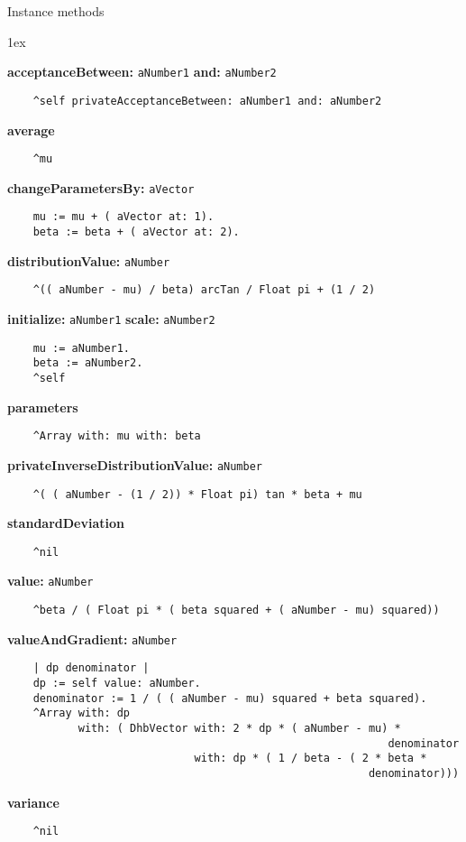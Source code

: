 Instance methods
{\parskip 1ex\par\noindent}
{\bf acceptanceBetween:} {\tt aNumber1} {\bf and:} {\tt aNumber2}
\begin{verbatim}
    ^self privateAcceptanceBetween: aNumber1 and: aNumber2

\end{verbatim}
{\bf average}
\begin{verbatim}
    ^mu

\end{verbatim}
{\bf changeParametersBy:} {\tt aVector}
\begin{verbatim}
    mu := mu + ( aVector at: 1).
    beta := beta + ( aVector at: 2).

\end{verbatim}
{\bf distributionValue:} {\tt aNumber}
\begin{verbatim}
    ^(( aNumber - mu) / beta) arcTan / Float pi + (1 / 2)

\end{verbatim}
{\bf initialize:} {\tt aNumber1} {\bf scale:} {\tt aNumber2}
\begin{verbatim}
    mu := aNumber1.
    beta := aNumber2.
    ^self

\end{verbatim}
{\bf parameters}
\begin{verbatim}
    ^Array with: mu with: beta

\end{verbatim}
{\bf privateInverseDistributionValue:} {\tt aNumber}
\begin{verbatim}
    ^( ( aNumber - (1 / 2)) * Float pi) tan * beta + mu

\end{verbatim}
{\bf standardDeviation}
\begin{verbatim}
    ^nil

\end{verbatim}
{\bf value:} {\tt aNumber}
\begin{verbatim}
    ^beta / ( Float pi * ( beta squared + ( aNumber - mu) squared))

\end{verbatim}
{\bf valueAndGradient:} {\tt aNumber}
\begin{verbatim}
    | dp denominator |
    dp := self value: aNumber.
    denominator := 1 / ( ( aNumber - mu) squared + beta squared).
    ^Array with: dp
           with: ( DhbVector with: 2 * dp * ( aNumber - mu) * 
                                                           denominator
                             with: dp * ( 1 / beta - ( 2 * beta * 
                                                        denominator)))

\end{verbatim}
{\bf variance}
\begin{verbatim}
    ^nil

\end{verbatim}

